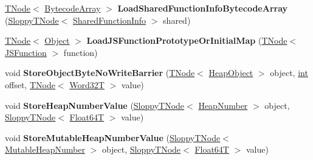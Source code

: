 \begin{DoxyCompactItemize}
\mbox{\hyperlink{classv8_1_1internal_1_1compiler_1_1TNode}{T\+Node}}$<$ \mbox{\hyperlink{classv8_1_1internal_1_1BytecodeArray}{Bytecode\+Array}} $>$ {\bfseries Load\+Shared\+Function\+Info\+Bytecode\+Array} (\mbox{\hyperlink{classv8_1_1internal_1_1compiler_1_1SloppyTNode}{Sloppy\+T\+Node}}$<$ \mbox{\hyperlink{classv8_1_1internal_1_1SharedFunctionInfo}{Shared\+Function\+Info}} $>$ shared)
\item 
\mbox{\label{classv8_1_1internal_1_1CodeStubAssembler_acefadcb215960dcfccb813152e17ef98}} 
\mbox{\hyperlink{classv8_1_1internal_1_1compiler_1_1TNode}{T\+Node}}$<$ \mbox{\hyperlink{classv8_1_1internal_1_1Object}{Object}} $>$ {\bfseries Load\+J\+S\+Function\+Prototype\+Or\+Initial\+Map} (\mbox{\hyperlink{classv8_1_1internal_1_1compiler_1_1TNode}{T\+Node}}$<$ \mbox{\hyperlink{classv8_1_1internal_1_1JSFunction}{J\+S\+Function}} $>$ function)
\item 
\mbox{\label{classv8_1_1internal_1_1CodeStubAssembler_aa8eeb523d308c10c23cd26f52fd05bdb}} 
void {\bfseries Store\+Object\+Byte\+No\+Write\+Barrier} (\mbox{\hyperlink{classv8_1_1internal_1_1compiler_1_1TNode}{T\+Node}}$<$ \mbox{\hyperlink{classv8_1_1internal_1_1HeapObject}{Heap\+Object}} $>$ object, \mbox{\hyperlink{classint}{int}} offset, \mbox{\hyperlink{classv8_1_1internal_1_1compiler_1_1TNode}{T\+Node}}$<$ \mbox{\hyperlink{structv8_1_1internal_1_1Word32T}{Word32T}} $>$ value)
\item 
\mbox{\label{classv8_1_1internal_1_1CodeStubAssembler_a7812aa350e5104fcc139915d97e47a2a}} 
void {\bfseries Store\+Heap\+Number\+Value} (\mbox{\hyperlink{classv8_1_1internal_1_1compiler_1_1SloppyTNode}{Sloppy\+T\+Node}}$<$ \mbox{\hyperlink{classv8_1_1internal_1_1HeapNumber}{Heap\+Number}} $>$ object, \mbox{\hyperlink{classv8_1_1internal_1_1compiler_1_1SloppyTNode}{Sloppy\+T\+Node}}$<$ \mbox{\hyperlink{structv8_1_1internal_1_1Float64T}{Float64T}} $>$ value)
\item 
\mbox{\label{classv8_1_1internal_1_1CodeStubAssembler_adedbb17c57be7ebfe5def03e4b0426cc}} 
void {\bfseries Store\+Mutable\+Heap\+Number\+Value} (\mbox{\hyperlink{classv8_1_1internal_1_1compiler_1_1SloppyTNode}{Sloppy\+T\+Node}}$<$ \mbox{\hyperlink{classv8_1_1internal_1_1MutableHeapNumber}{Mutable\+Heap\+Number}} $>$ object, \mbox{\hyperlink{classv8_1_1internal_1_1compiler_1_1SloppyTNode}{Sloppy\+T\+Node}}$<$ \mbox{\hyperlink{structv8_1_1internal_1_1Float64T}{Float64T}} $>$ value)

\end{DoxyCompactItemize}

